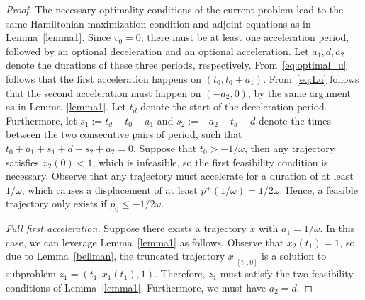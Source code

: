 \documentclass[a4paper]{article}
\theoremstyle{definition}
\theoremstyle{plain}
\begin{document}
\begin{proof}
  The necessary optimality conditions of the current problem lead to the same
  Hamiltonian maximization condition and adjoint equations as in
  Lemma~\ref{lemma1}. Since $v_{0} = 0$, there must be at least one acceleration
  period, followed by an optional deceleration and an optional acceleration. Let
  $a_{1}, d, a_{2}$ denote the durations of these three periods, respectively.
  From~\eqref{eq:optimal_u} follows that the first acceleration happens on
  $(t_{0}, t_{0} + a_{1})$. From~\eqref{eq:Lu} follows that the second
  acceleration must happen on $(-a_{2}, 0)$, by the same argument as in
  Lemma~\ref{lemma1}. Let $t_{d}$ denote the start of the deceleration period.
  Furthermore, let $s_{1} := t_{d}-t_{0}-a_{1}$ and $s_{2} := -a_{2}-t_{d}-d$ denote
  the times between the two consecutive pairs of period, such that
  $t_{0} + a_{1} + s_{1} + d + s_{2} + a_{2} = 0$.
  Suppose that $t_{0} > -1/\omega$, then any trajectory satisfies $x_{2}(0) < 1$,
  which is infeasible, so the first feasibility condition is necessary.
  Observe that any trajectory must accelerate for a duration of at least
  $1/\omega$, which causes a displacement of at least
  $p^{+}(1/\omega) = 1/2\omega$. Hence, a feasible trajectory only exists if
  $p_{0} \leq -1/2\omega$.

  \vspace{0.5em}
  \noindent
  \textit{Full first acceleration.}\;
  Suppose there exists a trajectory $x$ with $a_{1} = 1/\omega$. In this case, we can
  leverage Lemma~\ref{lemma1} as follows. Observe that $x_{2}(t_{1}) = 1$, so
  due to Lemma~\ref{bellman}, the truncated trajectory $x|_{[t_{1}, 0]}$ is a solution to
  subproblem $z_{1} = (t_{1}, x_{1}(t_{1}), 1)$. Therefore, $z_{1}$ must satisfy
  the two feasibility conditions of Lemma~\ref{lemma1}. Furthermore, we must have
  $a_{2} = d$.


\end{proof}
\end{document}
